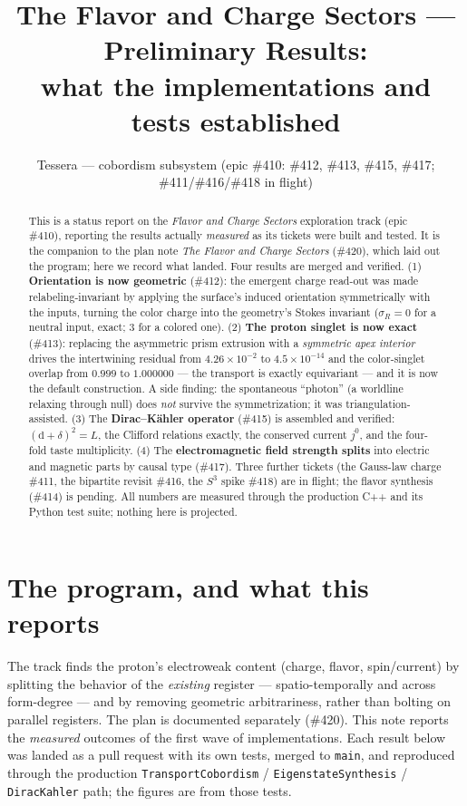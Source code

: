 \documentclass[11pt]{article}
\title{\bfseries The Flavor and Charge Sectors --- Preliminary Results:\\
what the implementations and tests established}
\author{Tessera --- cobordism subsystem (epic \#410: \#412, \#413, \#415, \#417;
\#411/\#416/\#418 in flight)}
\date{}
\newcommand{\sigmacol}{\sigma}
\newcommand{\dd}{\mathrm{d}}
\begin{document}
\maketitle

\begin{abstract}
This is a status report on the \emph{Flavor and Charge Sectors} exploration track
(epic \#410), reporting the results actually \emph{measured} as its tickets were built
and tested. It is the companion to the plan note \emph{The Flavor and Charge Sectors}
(\#420), which laid out the program; here we record what landed. Four results are merged
and verified. (1) \textbf{Orientation is now geometric} (\#412): the emergent
charge read-out was made relabeling-invariant by applying the surface's induced
orientation symmetrically with the inputs, turning the color charge into the geometry's
Stokes invariant ($\sigmacol_R = 0$ for a neutral input, exact; $3$ for a colored one).
(2) \textbf{The proton singlet is now exact} (\#413): replacing the asymmetric prism
extrusion with a \emph{symmetric apex interior} drives the intertwining residual from
$4.26\times10^{-2}$ to $4.5\times10^{-14}$ and the color-singlet overlap from $0.999$ to
$1.000000$ --- the transport is exactly equivariant --- and it is now the default
construction. A side finding: the spontaneous ``photon'' (a worldline relaxing through
null) does \emph{not} survive the symmetrization; it was triangulation-assisted. (3) The
\textbf{Dirac--K\"ahler operator} (\#415) is assembled and verified: $(\dd+\delta)^2=L$,
the Clifford relations exactly, the conserved current $j^0$, and the four-fold taste
multiplicity. (4) The \textbf{electromagnetic field strength splits} into electric and
magnetic parts by causal type (\#417). Three further tickets (the Gauss-law charge
\#411, the bipartite revisit \#416, the $S^3$ spike \#418) are in flight; the flavor
synthesis (\#414) is pending. All numbers are measured through the production C++ and
its Python test suite; nothing here is projected.
\end{abstract}

\tableofcontents

\section{The program, and what this reports}
The track finds the proton's electroweak content (charge, flavor, spin/current) by
splitting the behavior of the \emph{existing} register --- spatio-temporally and across
form-degree --- and by removing geometric arbitrariness, rather than bolting on parallel
registers. The plan is documented separately (\#420). This note reports the
\emph{measured} outcomes of the first wave of implementations. Each result below was
landed as a pull request with its own tests, merged to \texttt{main}, and reproduced
through the production \texttt{TransportCobordism} / \texttt{EigenstateSynthesis} /
\texttt{DiracKahler} path; the figures are from those tests.
\end{document}
